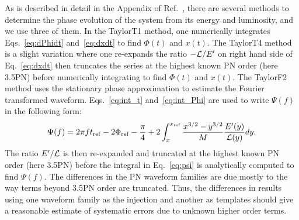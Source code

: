 \documentclass[twocolumn,prd,amssymb,aps,nofootinbib,showpacs,epsf]{revtex4}
\begin{document}
As is described in detail in the Appendix of Ref.~\cite{WadeCreightonOchsner2014}, there are several methods to determine the phase evolution of the system from its energy and luminosity, and we use three of them.  In the TaylorT1 method, one numerically integrates Eqs.~\eqref{eq:dPhidt} and~\eqref{eq:dxdt} to find $\Phi(t)$ and $x(t)$. The TaylorT4 method is a slight variation where one re-expands the ratio $-{\cal L}/E^\prime$ on right hand side of Eq.~\eqref{eq:dxdt} then truncates the series at the highest known PN order (here 3.5PN) before numerically integrating to find $\Phi(t)$ and $x(t)$. The TaylorF2 method uses the stationary phase approximation to estimate the Fourier transformed waveform.  Eqs.~\eqref{eq:int_t} and~\eqref{eq:int_Phi} are used to write $\Psi(f)$ in the following form:
\begin{equation}
\label{eq:psi}
\Psi(f)=2\pi f t_{\rm ref} - 2\Phi_{\rm ref} -\frac{\pi}{4}+ 2\int_x^{x_{\rm ref}}\frac{x^{3/2} - y^{3/2}}{M}\frac{E^\prime(y)}{{\cal L}(y)}dy.
\end{equation}
The ratio $E^\prime/{\cal L}$ is then re-expanded and truncated at the highest known PN order (here 3.5PN) before the integral in Eq.~\eqref{eq:psi} is analytically computed to find $\Psi(f)$.  The differences in the PN waveform families are due mostly to the way terms beyond 3.5PN order are truncated.  Thus, the differences in results using one waveform family as the injection and another as templates should give a reasonable estimate of systematic errors due to unknown higher order terms.
\end{document}
